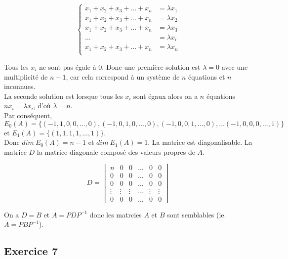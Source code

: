 \documentclass[]{book}
\theoremstyle{definition}
\begin{document}
$$
\left\{
\begin{array}{ll}
x_1 + x_2 + x_3 + \ldots + x_n & = \lambda x_1 \\
x_1 + x_2 + x_3 + \ldots + x_n & = \lambda x_2 \\
x_1 + x_2 + x_3 + \ldots + x_n & = \lambda x_3 \\
\ldots  & = \lambda x_i \\
x_1 + x_2 + x_3 + \ldots + x_n & = \lambda x_n \\
\end{array}
\right.
$$

Tous les $x_i$ ne sont pas \'egale \`a 0. Donc une premi\`ere solution est $\lambda = 0$ avec une multiplicit\'e de $n-1$, car cela correspond \`a un syst\`eme de $n$ \'equations et $n$ inconnues.\\
La seconde solution est lorsque tous les $x_i$ sont \'egaux alors on a $n$ \'equations $n x_i = \lambda x_i$, d'o\`u $\lambda = n$.\\

Par cons\'equent, $E_0(A) = \{(-1,1,0,0,\ldots,0),(-1,0,1,0,\ldots,0), (-1,0,0,1,\ldots,0), \dots (-1,0,0,0,\ldots,1)\}$ et $E_1(A) = \{(1,1,1,1,\dots,1)\}$.\\
Donc $dim\ E_0(A) = n-1$ et $dim\ E_1(A) = 1$. La matrice est diagonalisable. La matrice $D$ la matrice diagonale compos\'e des valeurs propres de $A$.

$$D=\begin{vmatrix} n & 0 & 0 & \ldots & 0 & 0 \\ 0 & 0 & 0 & \ldots & 0 & 0 \\ 0 & 0 & 0 & \ldots & 0 & 0 \\ \vdots & \vdots & \vdots & \ldots & \vdots & \vdots \\ 0 & 0 & 0 & \ldots & 0 & 0 \end{vmatrix}$$

On a $D=B$ et $A=PDP^{-1}$ donc les matrcies $A$ et $B$ sont semblables (ie. $A=PBP^{-1}$).

\subsection*{Exercice 7}
\end{document}
